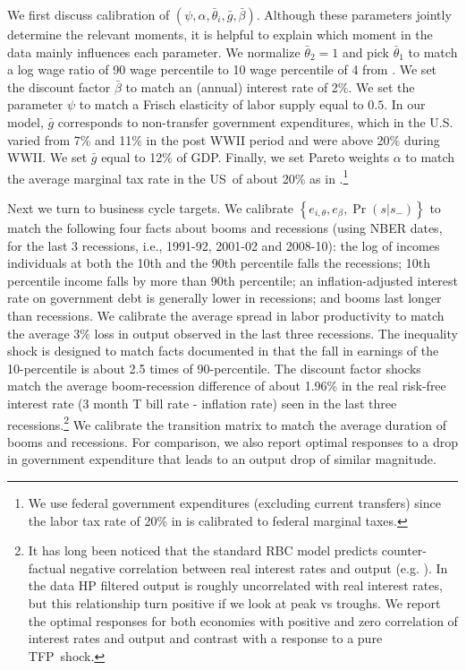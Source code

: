 \documentclass[thmsb,11pt]{article}
\begin{document}
\smallskip
We first discuss calibration of $\left( \psi ,\alpha ,\bar{\theta}%
_{i},\bar{g},\bar{\beta}\right) $. Although these parameters jointly
determine the relevant moments, it is helpful  to explain which moment
in the data mainly influences each parameter.   We normalize $\bar{\theta}_{2}=1$
and pick $\bar{\theta}_{1}$ to match a log wage ratio of 90 wage percentile to
10 wage percentile of 4 from \cite{Autor2008}. We set the discount factor $\bar{\beta}$
 to match an (annual) interest rate of 2\%. We set the parameter $\psi $
to match a Frisch elasticity of labor supply equal to $0.5$. In our model, $%
\bar{g}$ corresponds to non-transfer government expenditures, which
in the U.S. varied from 7\%  and  11\% in the post WWII period  and were above 20\% during WWII. We set
 $\bar{g}$ equal to 12\% of GDP. Finally, we set Pareto weights $\alpha $ to match the average
marginal tax rate in the US\ of about 20\% as in \cite{Chari1994}.\footnote{We use federal government expenditures (excluding current transfers) since the labor tax rate of 20\% in  \cite{Chari1994} is calibrated to federal marginal taxes.}

\smallskip Next we turn to  business cycle targets. We calibrate $\left\{
e_{i,\theta },e_{\beta},\Pr \left( s|s_{-}\right) \right\} $ to match the
following four facts about booms and recessions (using NBER dates, for the last 3 recessions, i.e., 1991-92, 2001-02 and 2008-10): the log of  incomes individuals at  both the 10th and the 90th percentile falls  the recessions; 10th percentile income falls by
more than 90th percentile; an  inflation-adjusted interest rate on government
debt is generally lower in recessions; and  booms last longer
than recessions. We calibrate the average spread in labor productivity  to
match the average 3\% loss in output observed in the last three recessions.
The inequality shock is designed to match
 facts documented in \cite{NBERw18035} that the fall in earnings of
the 10-percentile is about 2.5 times of 90-percentile.
 The discount factor shocks
match the average boom-recession difference of about 1.96\% in the real
risk-free interest rate (3 month T bill rate - inflation rate) seen in the
last three recessions.\footnote{%
It has long been noticed that the standard RBC model predicts counter-factual
negative correlation between real interest rates and output (e.g. \cite{Boldrin2001}). In the data HP filtered output is roughly uncorrelated with real
interest rates, but this relationship turn positive if we look at peak vs
troughs. We report the optimal responses for both economies with positive
and zero correlation of interest rates and output and contrast with a
response to a pure TFP\ shock.}  We calibrate the transition matrix  to match the
average duration of booms and recessions.
 For comparison, we also report  optimal responses to a drop in government expenditure that leads to an output drop of similar magnitude.
\end{document}
